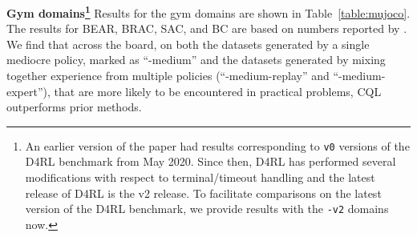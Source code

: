 \textbf{Gym domains\footnote{An earlier version of the paper had results corresponding to \texttt{v0} versions of the D4RL benchmark from May 2020. Since then, D4RL has performed several modifications with respect to terminal/timeout handling and the latest release of D4RL is the v2 release. To facilitate comparisons on the latest version of the D4RL benchmark, we provide results with the \texttt{-v2} domains now.}} Results for the gym domains are shown in Table~\ref{table:mujoco}. The results for BEAR, BRAC, SAC, and BC are based on numbers reported by \citet{d4rl}. We find that across the board, on both the datasets generated by a single mediocre policy, marked as ``-medium'' and the datasets generated by mixing together experience from multiple policies (``-medium-replay'' and ``-medium-expert''), that are more likely to be encountered in practical problems, CQL outperforms prior methods.



